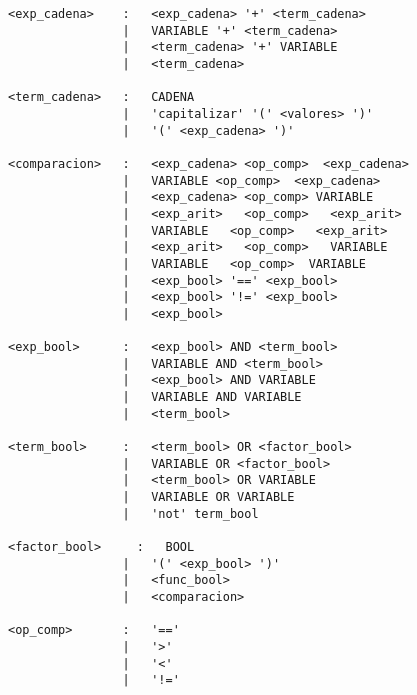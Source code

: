 \begin{verbatim}
<exp_cadena>    :   <exp_cadena> '+' <term_cadena>
                |   VARIABLE '+' <term_cadena>
                |   <term_cadena> '+' VARIABLE
                |   <term_cadena> 

<term_cadena>   :   CADENA
                |   'capitalizar' '(' <valores> ')'
                |   '(' <exp_cadena> ')'

<comparacion>   :   <exp_cadena> <op_comp>  <exp_cadena>
                |   VARIABLE <op_comp>  <exp_cadena>
                |   <exp_cadena> <op_comp> VARIABLE 
                |   <exp_arit>   <op_comp>   <exp_arit>
                |   VARIABLE   <op_comp>   <exp_arit>
                |   <exp_arit>   <op_comp>   VARIABLE
                |   VARIABLE   <op_comp>  VARIABLE 
                |   <exp_bool> '==' <exp_bool>
                |   <exp_bool> '!=' <exp_bool>
                |   <exp_bool>

<exp_bool>      :   <exp_bool> AND <term_bool>
                |   VARIABLE AND <term_bool>
                |   <exp_bool> AND VARIABLE
                |   VARIABLE AND VARIABLE
                |   <term_bool>

<term_bool>     :   <term_bool> OR <factor_bool>
                |   VARIABLE OR <factor_bool>
                |   <term_bool> OR VARIABLE
                |   VARIABLE OR VARIABLE
                |   'not' term_bool

<factor_bool>     :   BOOL
                |   '(' <exp_bool> ')'
                |   <func_bool>
                |   <comparacion>

<op_comp>       :   '=='
                |   '>'
                |   '<'
                |   '!='


    
\end{verbatim}
